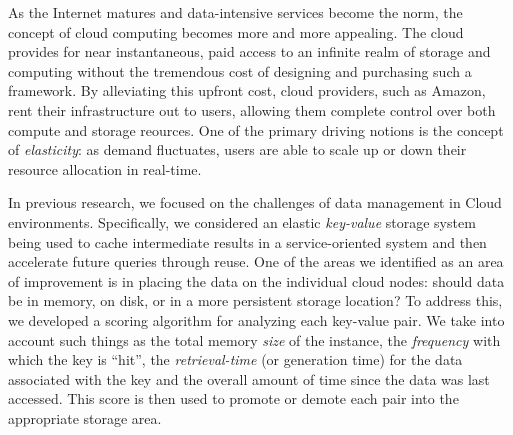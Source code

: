 As the Internet matures and data-intensive services become the norm, the
concept of cloud computing becomes more and more appealing. The cloud provides
for near instantaneous, paid access to an infinite realm of storage and
computing without the tremendous cost of designing and purchasing such a
framework. By alleviating this upfront cost, cloud providers, such as Amazon,
rent their infrastructure out to users, allowing them complete control over
both compute and storage reources. One of the primary driving notions is the
concept of \emph{elasticity}: as demand fluctuates, users are able to scale up
or down their resource allocation in real-time.

In previous research, we focused on the challenges of data management in Cloud
environments. Specifically, we considered an elastic \emph{key-value} storage
system being used to cache intermediate results in a service-oriented system
and then accelerate future queries through reuse. One of the areas we
identified as an area of improvement is in placing the data on the individual
cloud nodes: should data be in memory, on disk, or in a more persistent storage
location? To address this, we developed a scoring algorithm for analyzing each
key-value pair. We take into account such things as the total memory
\emph{size} of the instance, the \emph{frequency} with which the key is
``hit'', the \emph{retrieval-time} (or generation time) for the data associated
with the key and the overall amount of time since the data was last accessed.
This score is then used to promote or demote each pair into the appropriate
storage area.
